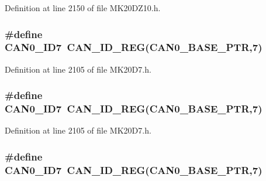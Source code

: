 Definition at line 2150 of file M\+K20\+D\+Z10.\+h.

\subsubsection[{\texorpdfstring{C\+A\+N0\+\_\+\+I\+D7}{CAN0_ID7}}]{\setlength{\rightskip}{0pt plus 5cm}\#define C\+A\+N0\+\_\+\+I\+D7~{\bf C\+A\+N\+\_\+\+I\+D\+\_\+\+R\+EG}({\bf C\+A\+N0\+\_\+\+B\+A\+S\+E\+\_\+\+P\+TR},7)}\hypertarget{group___c_a_n___register___accessor___macros_ga936184bbc1c8f3d863b8e0fed5a46090}{}\label{group___c_a_n___register___accessor___macros_ga936184bbc1c8f3d863b8e0fed5a46090}


Definition at line 2105 of file M\+K20\+D7.\+h.

\subsubsection[{\texorpdfstring{C\+A\+N0\+\_\+\+I\+D7}{CAN0_ID7}}]{\setlength{\rightskip}{0pt plus 5cm}\#define C\+A\+N0\+\_\+\+I\+D7~{\bf C\+A\+N\+\_\+\+I\+D\+\_\+\+R\+EG}({\bf C\+A\+N0\+\_\+\+B\+A\+S\+E\+\_\+\+P\+TR},7)}\hypertarget{group___c_a_n___register___accessor___macros_ga936184bbc1c8f3d863b8e0fed5a46090}{}\label{group___c_a_n___register___accessor___macros_ga936184bbc1c8f3d863b8e0fed5a46090}


Definition at line 2105 of file M\+K20\+D7.\+h.

\subsubsection[{\texorpdfstring{C\+A\+N0\+\_\+\+I\+D7}{CAN0_ID7}}]{\setlength{\rightskip}{0pt plus 5cm}\#define C\+A\+N0\+\_\+\+I\+D7~{\bf C\+A\+N\+\_\+\+I\+D\+\_\+\+R\+EG}({\bf C\+A\+N0\+\_\+\+B\+A\+S\+E\+\_\+\+P\+TR},7)}\hypertarget{group___c_a_n___register___accessor___macros_ga936184bbc1c8f3d863b8e0fed5a46090}{}\label{group___c_a_n___register___accessor___macros_ga936184bbc1c8f3d863b8e0fed5a46090}


